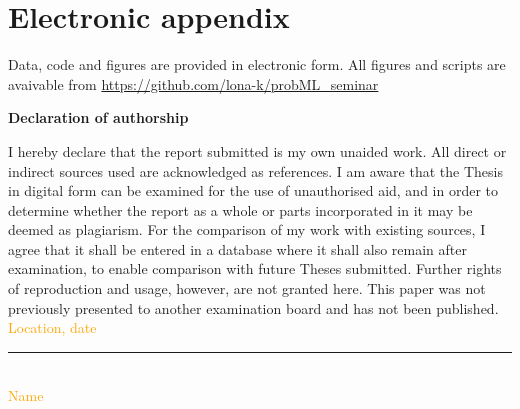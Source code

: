 \documentclass[12pt]{article}
\begin{document}
\section{Electronic appendix}
\label{el_app}

Data, code and figures are provided in electronic form. All figures and scripts are avaivable from \url{https://github.com/lona-k/probML_seminar}

\newpage


\RaggedRight


\newpage


\Large
\noindent
\textbf{Declaration of authorship}
\vspace{0.5cm}
\noindent
\normalsize

I hereby declare that the report submitted is my own unaided work. All direct
or indirect sources used are acknowledged as references. I am aware that the
Thesis in digital form can be examined for the use of unauthorised aid, and in
order to determine whether the report as a whole or parts incorporated in it may
be deemed as plagiarism. For the comparison of my work with existing sources, I
agree that it shall be entered in a database where it shall also remain after
examination, to enable comparison with future Theses submitted. Further rights
of reproduction and usage, however, are not granted here. This paper was not
previously presented to another examination board and has not been published.
\\

\vspace{1cm}
\textcolor{orange}{Location, date} \\

\vspace{3cm}

\noindent\rule{0.5\textwidth}{0.4pt} \\

\textcolor{orange}{Name}

\end{document}
